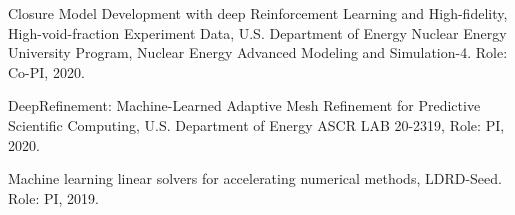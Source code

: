 \documentclass[letterpaper]{article}
\renewenvironment{itemize}{
  \begin{list}{}{
    \setlength{\leftmargin}{1.5em}
  }
}{
  \end{list}
}
\begin{document}
\begin{itemize}

  \item Closure Model Development with deep Reinforcement Learning and High-fidelity, High-void-fraction  Experiment Data, U.S. Department of Energy Nuclear Energy University Program, Nuclear Energy Advanced Modeling and Simulation-4. Role: Co-PI, 2020.

  \item DeepRefinement: Machine-Learned Adaptive Mesh Refinement for Predictive Scientific Computing, U.S. Department of Energy ASCR LAB 20-2319, Role: PI, 2020.

  \item Machine learning linear solvers for accelerating numerical methods, LDRD-Seed. Role: PI, 2019.

\end{itemize}

\bigskip

\end{document}
